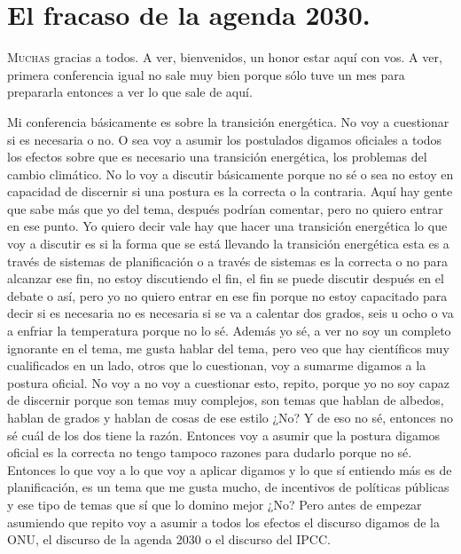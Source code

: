 \chapter{El fracaso de la agenda 2030.}


\lettrine[lines=2, findent=3pt, nindent=0pt]{M}{uchas} gracias a todos. A ver, bienvenidos, un honor estar aquí con vos. A ver, primera conferencia igual no sale muy bien porque sólo tuve un mes para prepararla entonces a ver lo que sale de aquí.

Mi conferencia básicamente es sobre la transición energética. No voy a cuestionar si es necesaria o no. O sea voy a asumir los postulados digamos oficiales a todos los efectos sobre que es necesario una transición energética, los problemas del cambio climático. No lo voy a discutir básicamente porque no sé o sea no estoy en capacidad de discernir si una postura es la correcta o la contraria. Aquí hay gente que sabe más que yo del tema, después podrían comentar, pero no quiero entrar en ese punto. Yo quiero decir vale hay que hacer una transición energética lo que voy a discutir es si la forma que se está llevando la transición energética esta es a través de sistemas de planificación o a través de sistemas es la correcta o no para alcanzar ese fin, no estoy discutiendo el fin, el fin se puede discutir después en el debate o así, pero yo no quiero entrar en ese fin porque no estoy capacitado para decir si es necesaria no es necesaria si se va a calentar dos grados, seis u ocho o va a enfriar la temperatura porque no lo sé. Además yo sé, a ver no soy un completo ignorante en el tema, me gusta hablar del tema, pero veo que hay científicos muy cualificados en un lado, otros que lo cuestionan, voy a sumarme digamos a la postura oficial. No voy a no voy a cuestionar esto, repito, porque yo no soy capaz de discernir porque son temas muy complejos, son temas que hablan de albedos, hablan de grados y hablan de cosas de ese estilo ¿No? Y de eso no sé, entonces no sé cuál de los dos tiene la razón. Entonces voy a asumir que la postura digamos oficial es la correcta no tengo tampoco razones para dudarlo porque no sé. Entonces lo que voy a lo que voy a aplicar digamos y lo que sí entiendo más es de planificación, es un tema que me gusta mucho, de incentivos de políticas públicas y ese tipo de temas que sí que lo domino mejor ¿No? Pero antes de empezar asumiendo que repito voy a asumir a todos los efectos el discurso digamos de la ONU, el discurso de la agenda 2030 o el discurso del IPCC.

